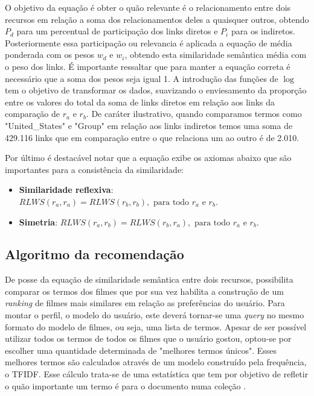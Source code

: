 O objetivo da equação é obter o quão relevante é o relacionamento entre dois recursos em relação a soma dos relacionamentos deles a quaisquer outros, obtendo $P_d$ para um percentual de participação dos links diretos e $P_i$ para os indiretos. Posteriormente essa participação ou relevancia é aplicada a equação de média ponderada com os pesos $w_d$ e $w_i$, obtendo esta similaridade semântica média com o peso dos links. É importante ressaltar que para manter a equação correta é necessário que a soma dos pesos seja igual 1. A introdução das funções de $\log$ tem o objetivo de transformar os dados, suavizando o enviesamento da proporção entre os valores do total da soma de links diretos em relação aos links da comparação de $r_a$ e $r_b$. De caráter ilustrativo, quando comparamos termos como "United\_States" e "Group" em relação aos links indiretos temos uma soma de 429.116 links que em comparação entre o que relaciona um ao outro é de 2.010.

Por último é destacável notar que a equação exibe os axiomas abaixo que são importantes para a consistência da similaridade:

\begin{itemize}
	\item{\textbf{Similaridade reflexiva}: $RLWS(r_a, r_a) = RLWS(r_b, r_b), \text{ para todo } r_a \text{ e } r_b$.}
	\item{\textbf{Simetria}: $RLWS(r_a, r_b) = RLWS(r_b, r_a), \text{ para todo } r_a \text{ e } r_b$.}
\end{itemize}

\subsection{Algoritmo da recomendação}
\label{ssec:rec_alg}

De posse da equação de similaridade semântica entre dois recursos, possibilita
comparar os termos dos filmes que por sua vez habilita a construção de um \textit{ranking} de filmes mais similares em relação as preferências do usuário. Para montar o perfil, o modelo do usuário, este deverá tornar-se uma \textit{query} no mesmo formato do modelo de filmes, ou seja, uma lista de termos. Apesar de ser possível utilizar todos os termos de todos os filmes que o usuário gostou, optou-se por escolher uma quantidade determinada de "melhores termos únicos". Esses melhores termos são calculados através de um modelo construído pela frequência, o \ac{TFIDF}. Esse cálculo trata-se de uma estatística que tem por objetivo de refletir o quão importante um termo é para o documento numa coleção \citep{rajaraman_ullman_2011}.

